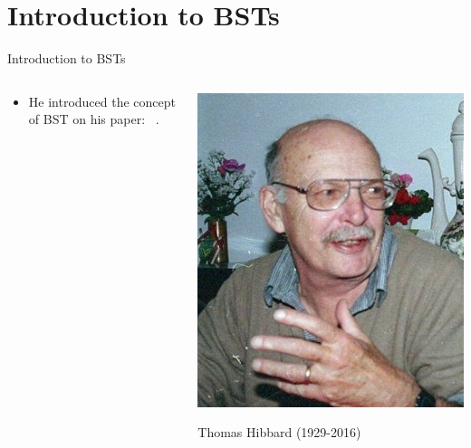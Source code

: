 \documentclass{beamer}
\begin{document}
\section{Introduction to BSTs}
\begin{frame}{Introduction to BSTs}
    
\begin{columns}[c]
    \begin{column}{0.5\textwidth}
     \begin{itemize}
         \item He introduced the concept of BST on his paper: ~.
     \end{itemize}
    \end{column}
    \begin{column}{0.5\textwidth}
        \includegraphics[width=\textwidth]{hibbard.jpg}
        \begin{center}
            Thomas Hibbard (1929-2016)
        \end{center}
    \end{column}
    
\end{columns}
\end{frame}
\end{document}
